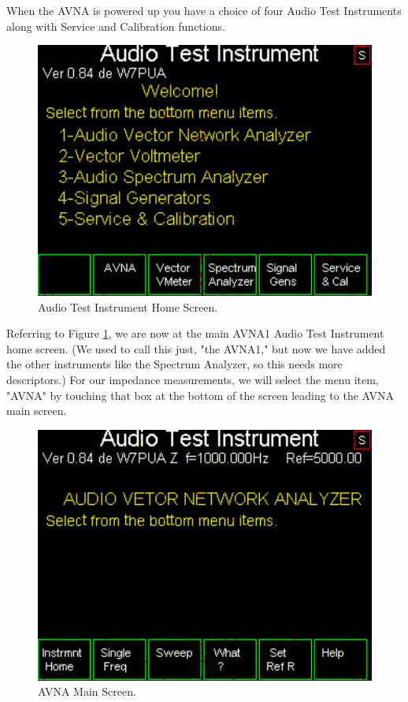 When the AVNA is powered up you have a choice of four Audio Test Instruments along with Service and Calibration functions.
\begin{figure}[H]
\begin{center}
\includegraphics[scale=0.75]{./images/AVNA_000.pdf}
\caption{Audio Test Instrument Home  Screen.}
\label{AVNA_000-label}
\end{center}
\end{figure}
%
Referring to Figure \ref{AVNA_000-label}, we are now at the main AVNA1 Audio Test Instrument home screen. (We used to call this just, "the AVNA1," but now we have added the other instruments like the Spectrum Analyzer, so this needs more descriptors.) For our impedance measurements, we will select the menu item, "AVNA" by touching that box at the bottom of the screen leading to the AVNA main screen.
\begin{figure}[H]
\begin{center}
\includegraphics[scale=0.75]{./images/AVNA_001.pdf}
\caption{AVNA Main  Screen.}
\label{AVNA_001-label}
\end{center}
\end{figure}
